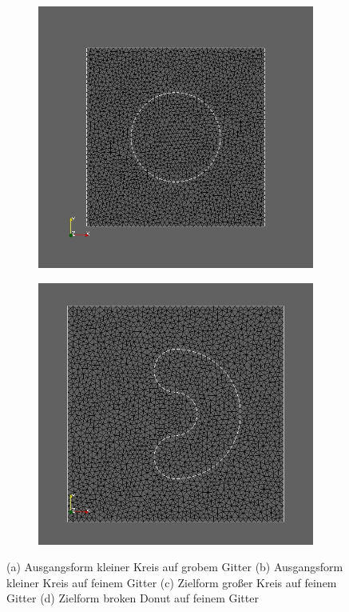 \begin{figure}
\begin{subfigure}{0.5\textwidth}
	\caption{}	
	\end{subfigure}
	\begin{subfigure}{0.5\textwidth}
	\centering
	\includegraphics[scale=0.25]{pic_bigcircle_fine.jpg}
	\caption{}	
	\end{subfigure}
	\begin{subfigure}{0.5\textwidth}
	\centering
	\includegraphics[scale=0.25]{pic_brokendonut_fine.jpg}
	\caption{}	
	\end{subfigure}
\caption{(a) Ausgangsform kleiner Kreis auf grobem Gitter (b) Ausgangsform kleiner Kreis auf feinem Gitter (c) Zielform großer Kreis auf feinem Gitter (d) Zielform broken Donut auf feinem Gitter}
\label{Meshes}
\end{figure}

